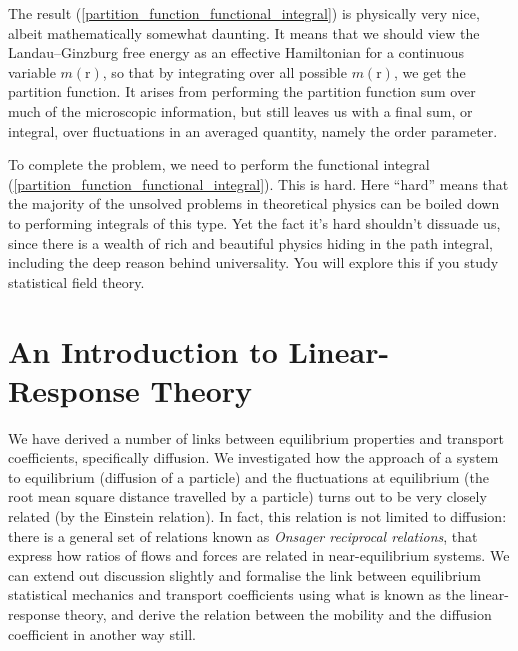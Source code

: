 \documentclass{article}
\theoremstyle{plain}\theoremheaderfont{\normalfont\bfseries}\theorembodyfont{\rmfamily}\theoremseparator{.}\newtheorem*{thm}{Theorem}\newtheorem*{law}{Law}\newtheorem*{pos}{Postulate}
\numberwithin{equation}{section}
\newcommand{\vb}[1]{\bm{\mathrm{#1}}}
\begin{document}
    The result (\ref{partition_function_functional_integral}) is physically very nice, albeit mathematically somewhat daunting. It means that we should view the Landau--Ginzburg free energy as an effective Hamiltonian for a continuous variable \(m(\vb{r})\), so that by integrating over all possible \(m(\vb{r})\), we get the partition function. It arises from performing the partition function sum over much of the microscopic information, but still leaves us with a final sum, or integral, over fluctuations in an averaged quantity, namely the order parameter.

    To complete the problem, we need to perform the functional integral (\ref{partition_function_functional_integral}). This is hard. Here ``hard'' means that the majority of the unsolved problems in theoretical physics can be boiled down to performing integrals of this type. Yet the fact it's hard shouldn't dissuade us, since there is a wealth of rich and beautiful physics hiding in the path integral, including the deep reason behind universality. You will explore this if you study statistical field theory.


    \section{An Introduction to Linear-Response Theory}\label{Chap:Intro_to_Linear_Response}
    We have derived a number of links between equilibrium properties and transport coefficients, specifically diffusion. We investigated how the approach of a system to equilibrium (diffusion of a particle) and the fluctuations at equilibrium (the root mean square distance travelled by a particle) turns out to be very closely related (by the Einstein relation). In fact, this relation is not limited to diffusion: there is a general set of relations known as \textit{Onsager reciprocal relations}, that express how ratios of flows and forces are related in near-equilibrium systems. We can extend out discussion slightly and formalise the link between equilibrium statistical mechanics and transport coefficients using what is known as the linear-response theory, and derive the relation between the mobility and the diffusion coefficient in another way still.
\end{document}

